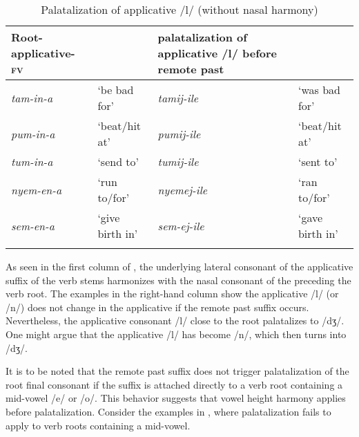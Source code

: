 \documentclass[output=paper]{langsci/langscibook}
\begin{document}
\begin{table}
\begin{tabularx}{\textwidth}{p{2.3cm}Xp{4cm}X}
\lsptoprule
Root-applicative-\textsc{fv} &  & palatalization of applicative /l/ before remote past & \\
\midrule 
\textit{tam-in-a} & `be bad for' & \textit{tamij-ile} & `was bad for' \\
\textit{pum-in-a} & `beat/hit at' & \textit{pumij-ile} & `beat/hit at' \\
\textit{tum-in-a} & `send to' & \textit{tumij-ile} & `sent to' \\
\textit{nyem-en-a} & `run to/for' & \textit{nyemej-ile} & `ran to/for' \\
\textit{sem-en-a} & `give birth in' & \textit{sem-ej-ile} & `gave birth in' \\

\lspbottomrule
\end{tabularx}

\caption{Palatalization of applicative /l/ (without nasal harmony)}
\label{tab:15.kawasha}

\end{table}

As seen in the first column of , the underlying lateral consonant of the applicative suffix of the verb stems harmonizes with the nasal consonant of the preceding the verb root. The examples in the right-hand column show the applicative /l/ (or /n/) does not change in the applicative if the remote past suffix occurs. Nevertheless, the applicative consonant /l/ close to the root palatalizes to /dʒ/. One might argue that the applicative /l/ has become /n/, which then turns into /dʒ/. 

It is to be noted that the remote past suffix does not trigger palatalization of the root final consonant if the suffix is attached directly to a verb root containing a mid-vowel /e/ or /o/. This behavior suggests that vowel height harmony applies before palatalization. Consider the examples in , where palatalization fails to apply to verb roots containing a mid-vowel. 
\end{document}
